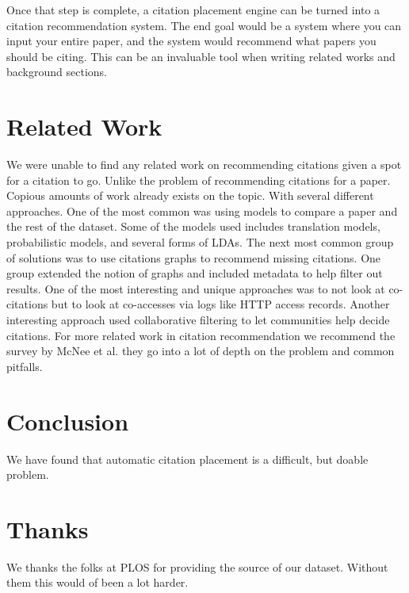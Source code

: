 \documentclass[10pt, conference, compsocconf]{IEEEtran}
\begin{document}
Once that step is complete, a citation placement engine can be turned into a citation recommendation system.
The end goal would be a system where you can input your entire paper, and the system would recommend what papers
you should be citing. This can be an invaluable tool when writing related works and background sections.

\section{Related Work}\label{sec:related}
We were unable to find any related work on recommending citations given a spot for a citation to go. Unlike the problem of recommending citations for a paper. Copious amounts of work already exists on the topic. With several different approaches. One of the most common was using models to compare a paper and the rest of the dataset. Some of the models used includes translation models, probabilistic models, and several forms of LDAs.\cite{cite1, cite2, cite3} The next most common group of solutions was to use citations graphs to recommend missing citations.\cite{cite6} One group extended the notion of graphs and included metadata to help filter out results.\cite{cite4} One of the most 
interesting and unique approaches was to not look at co-citations but to look at co-accesses via logs like HTTP access records.\cite{cite7}
Another interesting approach used collaborative filtering to let communities help decide citations.\cite{cite8} For more related work in
citation recommendation we recommend the survey by McNee et al. they go into a lot of depth on the problem and common pitfalls.\cite{cite5}

\section{Conclusion}\label{sec:conclusion}
We have found that automatic citation placement is a difficult, but doable problem.

\section{Thanks}
We thanks the folks at PLOS for providing the source of our dataset. Without them this would of been a lot harder.



\end{document}
